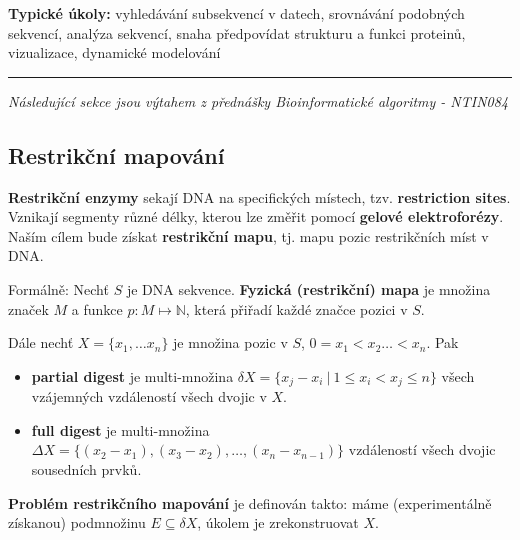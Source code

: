 \documentclass[11pt]{report} %
\newcommand{\N}{\mathbb{N}}
\numberwithin{equation}{section}
\begin{document}
\textbf{Typické úkoly:} vyhledávání subsekvencí v datech, srovnávání podobných sekvencí, analýza sekvencí, snaha předpovídat strukturu a funkci proteinů, vizualizace, dynamické modelování 

\bigskip
\hrule
\medskip
\textit{Následující sekce jsou výtahem z přednášky Bioinformatické algoritmy - NTIN084}

\subsection{Restrikční mapování}
\textbf{Restrikční enzymy} sekají DNA na specifických místech, tzv. \textbf{restriction sites}. Vznikají segmenty různé délky, kterou lze změřit pomocí \textbf{gelové elektroforézy}. Naším cílem bude získat \textbf{restrikční mapu}, tj. mapu pozic restrikčních míst v DNA. 

Formálně: Nechť $S$ je DNA sekvence. \textbf{Fyzická (restrikční) mapa} je množina značek $M$ a funkce $p: M \mapsto \N$, která přiřadí každé značce pozici v $S$. 

Dále nechť $X = \{x_1,\dots x_n\}$ je množina pozic v $S$, $0 = x_1 < x_2 \dots < x_n$. Pak
\begin{itemize}
	\item \textbf{partial digest} je multi-množina $\delta X = \{x_j - x_i\ |\ 1 \leq x_i < x_j \leq n\}$ všech vzájemných vzdáleností všech dvojic v $X$.
	
	\item \textbf{full digest} je multi-množina $\Delta X = \{(x_2 -x_1), (x_3 - x_2), \dots, (x_n - x_{n-1}) \}$ vzdáleností všech dvojic sousedních prvků.
\end{itemize}

\textbf{Problém restrikčního mapování} je definován takto: máme (experimentálně získanou) podmnožinu $E \subseteq \delta X$, úkolem je zrekonstruovat $X$.
\end{document}
